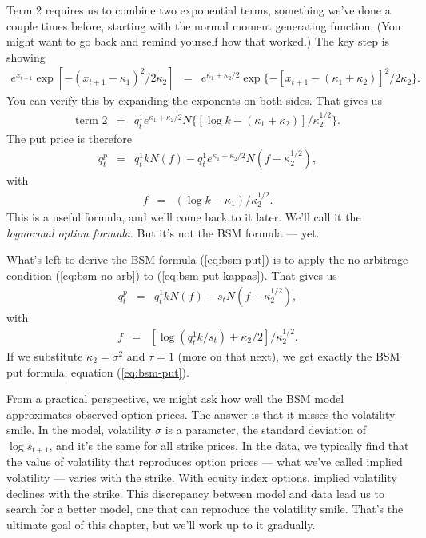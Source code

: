 \documentclass[11pt]{article}
\begin{document}
Term 2 requires us to combine two exponential terms, something
we've done a couple times before, starting with the normal
moment generating function.
(You might want to go back and remind yourself how that worked.)
The key step is showing
\begin{eqnarray*}
    e^{x_{t+1}} \exp[ - (x_{t+1} - \kappa_1)^2/2\kappa_2] &=&
        e^{\kappa_1 + \kappa_2/2} \exp\{ - [x_{t+1} - (\kappa_1+\kappa_2)]^2/2\kappa_2 \} .
\end{eqnarray*}
You can verify this by expanding the exponents on both sides.
That gives us
\begin{eqnarray*}
    \mbox{term 2} &=& q^1_t e^{\kappa_1 + \kappa_2/2}
            N \{ [\log k - (\kappa_1 + \kappa_2)]/\kappa_2^{1/2} \} .
\end{eqnarray*}
The put price is therefore
\begin{eqnarray}
    q^p_t &=& q^1_t k N (f) - q^1_t e^{\kappa_1 + \kappa_2/2}
            N ( f - \kappa_2^{1/2} ),
    \label{eq:bsm-put-kappas}
\end{eqnarray}
with
\begin{eqnarray*}
    f &=&  (\log k - \kappa_1)/\kappa_2^{1/2} .
\end{eqnarray*}
This is a useful formula, and we'll come back to it later.
We'll call it the {\it lognormal option formula\/}.
But it's not the BSM formula --- yet.

What's left to derive the BSM formula (\ref{eq:bsm-put})
is to apply the no-arbitrage condition (\ref{eq:bsm-no-arb})
to (\ref{eq:bsm-put-kappas}).
That gives us
\begin{eqnarray}
    q^p_t &=& q^1_t k N (f) - s_t N ( f - \kappa_2^{1/2} ),
    \label{eq:bsm-put-kappas-bsm}
\end{eqnarray}
with
\begin{eqnarray*}
    f &=&  [\log (q^1_t k/s_t) + \kappa_2/2]/\kappa_2^{1/2} .
\end{eqnarray*}
If we substitute $\kappa_2 = \sigma^2$ and $\tau = 1$ (more on that next),
we get exactly the BSM put formula, equation (\ref{eq:bsm-put}).

From a practical perspective, we might ask how well the BSM model
approximates observed option prices.
The answer is that it misses the volatility smile.
In the model, volatility $\sigma$ is a parameter,
the standard deviation of $\log s_{t+1}$,
and  it's the same for all strike prices.
In the data, we typically find that the value of volatility that reproduces
option prices --- what we've called implied volatility ---
varies with the strike.
With equity index options, implied volatility declines with the strike.
This discrepancy between model and data lead us to search
for a better model, one that can reproduce the volatility smile.
That's the ultimate goal of this chapter,
but we'll work up to it gradually.
\end{document}
